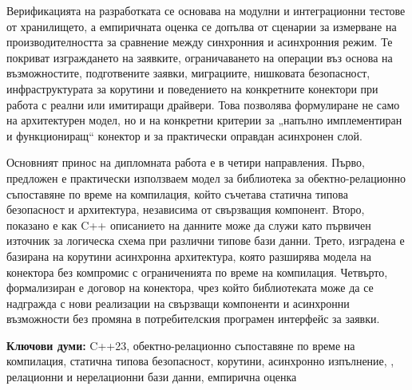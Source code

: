 Верификацията на разработката се основава на модулни и интеграционни тестове от хранилището, а емпиричната оценка се допълва от сценарии за измерване на производителността за сравнение между синхронния и асинхронния режим. Те покриват изграждането на заявките, ограничаването на операции въз основа на възможностите, подготвените заявки, миграциите, нишковата безопасност, инфраструктурата за корутини и поведението на конкретните конектори при работа с реални или имитиращи драйвери. Това позволява формулиране не само на архитектурен модел, но и на конкретни критерии за „напълно имплементиран и функциониращ“ конектор и за практически оправдан асинхронен слой.

Основният принос на дипломната работа е в четири направления. Първо, предложен е практически използваем модел за библиотека за обектно-релационно съпоставяне по време на компилация, който съчетава статична типова безопасност и архитектура, независима от свързващия компонент. Второ, показано е как C++ описанието на данните може да служи като първичен източник за логическа схема при различни типове бази данни. Трето, изградена е базирана на корутини асинхронна архитектура, която разширява модела на конектора без компромис с ограниченията по време на компилация. Четвърто, формализиран е договор на конектора, чрез който библиотеката може да се надгражда с нови реализации на свързващи компоненти и асинхронни възможности без промяна в потребителския програмен интерфейс за заявки.

\vspace{1cm}

\textbf{Ключови думи:} C++23, обектно-релационно съпоставяне по време на компилация, статична типова безопасност, корутини, асинхронно изпълнение, , релационни и нерелационни бази данни, емпирична оценка
